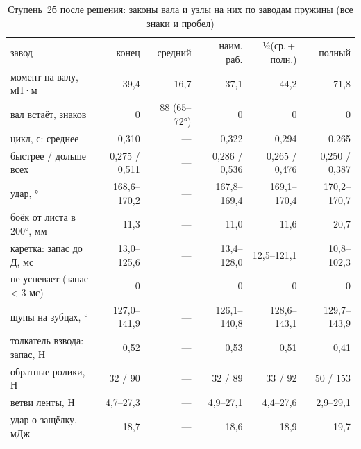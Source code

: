 \begin{table}[h]\centering\footnotesize
\caption{Ступень~2б после решения: законы вала и узлы на них по заводам пружины (все знаки и пробел)}\label{tab:stage2b}
\begin{tabular}{lrrrrr}
\toprule
завод & конец & средний & наим. раб. & ½(ср.\,+\,полн.) & полный \\
момент на валу, мН·м & 39{,}4 & 16{,}7 & 37{,}1 & 44{,}2 & 71{,}8 \\
\midrule
вал встаёт, знаков & 0 & 88 (65--72°) & 0 & 0 & 0 \\
цикл, с: среднее & 0{,}310 & --- & 0{,}322 & 0{,}294 & 0{,}265 \\
\quad быстрее / дольше всех & 0{,}275 / 0{,}511 & --- & 0{,}286 / 0{,}536 & 0{,}265 / 0{,}476 & 0{,}250 / 0{,}387 \\
удар, ° & 168{,}6--170{,}2 & --- & 167{,}8--169{,}4 & 169{,}1--170{,}4 & 170{,}2--170{,}7 \\
боёк от листа в 200°, мм & 11{,}3 & --- & 11{,}0 & 11{,}6 & 20{,}7 \\
каретка: запас до Д, мс & 13{,}0--125{,}6 & --- & 13{,}4--128{,}0 & 12{,}5--121{,}1 & 10{,}8--102{,}3 \\
\quad не успевает (запас < 3 мс) & 0 & --- & 0 & 0 & 0 \\
щупы на зубцах, ° & 127{,}0--141{,}9 & --- & 126{,}1--140{,}8 & 128{,}6--143{,}1 & 129{,}7--143{,}9 \\
толкатель взвода: запас, Н & 0{,}52 & --- & 0{,}53 & 0{,}51 & 0{,}41 \\
обратные ролики, Н & 32 / 90 & --- & 32 / 89 & 33 / 92 & 50 / 153 \\
ветви ленты, Н & 4{,}7--27{,}3 & --- & 4{,}9--27{,}1 & 4{,}4--27{,}6 & 2{,}9--29{,}1 \\
удар о защёлку, мДж & 18{,}7 & --- & 18{,}6 & 18{,}9 & 19{,}7 \\
\bottomrule
\end{tabular}
\end{table}
